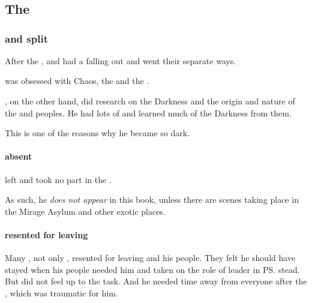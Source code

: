 \chapter{\ResphanWarsBook}
\section{The \Dragons}
\subsection{\Ishnaruchaefir{} and \Secherdamon{} split}
After the , \Ishnaruchaefir{} and \Secherdamon{} had a falling out and went their separate ways. 

\Secherdamon{} was obsessed with Chaos, the \xzaishanns{} and the \firstgendragons. 

\Ishnaruchaefir, on the other hand, did research on the Darkness and the origin and nature of the \bane{} and \resphan{} peoples. He had lots of  and learned much of the Darkness from them. 

This is one of the reasons why he became so dark. 






\subsubsection{\Ishnaruchaefir{} absent}
\Ishnaruchaefir{} left \Miith{} and took no part in the \resphanwars. 

As such, he \emph{does not appear} in this book, unless there are scenes taking place in the Mirage Asylum and other exotic places. 






\subsubsection{\Ishnaruchaefir{} resented for leaving}
Many \dragons, not only \Secherdamon, resented \Ishnaruchaefir{} for leaving and  his people.
They felt he should have stayed when his people needed him and taken on the role of leader in \ps{\Nexagglachel} stead. 
But \Ishnaruchaefir{} did not feel up to the task. 
And he needed time away from everyone after the \SecondShrouding, which was traumatic for him. 









